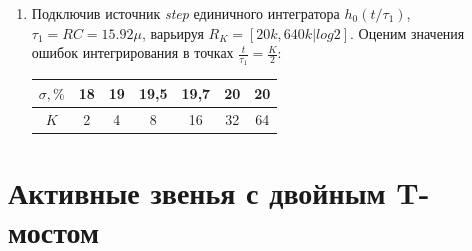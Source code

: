 \documentclass[a4paper, 12pt]{article}%
\begin{document}
\begin{enumerate}
\item Подключив источник \textit{step} единичного интегратора $h_0(t / \tau_1)$, $\tau_1 = RC = 15.92\mu$, варьируя $R_K = [20k, 640k|log2]$. Оценим значения ошибок интегрирования в точках $\frac{t}{\tau_1} = \frac{K}{2}$:

\begin{center}
\begin{tabular}{|c|c|c|c|c|c|c|}
\hline 
$\sigma, \%$ & 18 & 19 & 19,5 & 19,7 & 20 & 20 \\ 
\hline 
$K$ & 2 & 4 & 8 & 16 & 32 & 64 \\ 
\hline 
\end{tabular} 
\end{center}

\end{enumerate}

\section{Активные звенья с двойным T-мостом}
\end{document}
